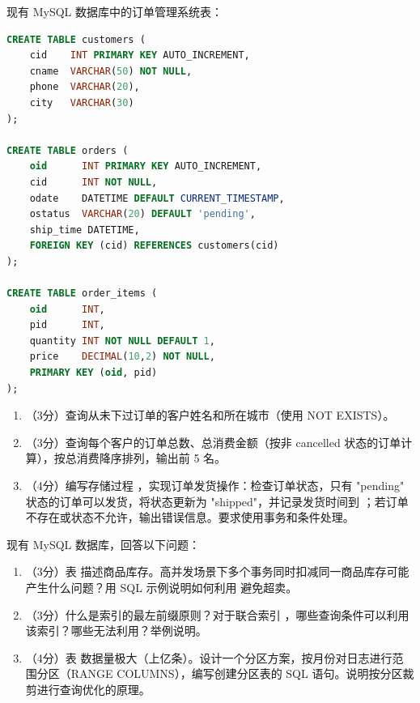 \documentclass[a4paper,11pt]{article}
\begin{document}
\q 现有 MySQL 数据库中的订单管理系统表：
\begin{lstlisting}[language=SQL]
CREATE TABLE customers (
    cid    INT PRIMARY KEY AUTO_INCREMENT,
    cname  VARCHAR(50) NOT NULL,
    phone  VARCHAR(20),
    city   VARCHAR(30)
);

CREATE TABLE orders (
    oid      INT PRIMARY KEY AUTO_INCREMENT,
    cid      INT NOT NULL,
    odate    DATETIME DEFAULT CURRENT_TIMESTAMP,
    ostatus  VARCHAR(20) DEFAULT 'pending',
    ship_time DATETIME,
    FOREIGN KEY (cid) REFERENCES customers(cid)
);

CREATE TABLE order_items (
    oid      INT,
    pid      INT,
    quantity INT NOT NULL DEFAULT 1,
    price    DECIMAL(10,2) NOT NULL,
    PRIMARY KEY (oid, pid)
);
\end{lstlisting}
\begin{enumerate}[leftmargin=2em, itemsep=3pt]
  \item[（1）] （3分）查询从未下过订单的客户姓名和所在城市（使用 NOT EXISTS）。
  \item[（2）] （3分）查询每个客户的订单总数、总消费金额（按非 cancelled 状态的订单计算），按总消费降序排列，输出前 5 名。
  \item[（3）] （4分）编写存储过程 ，实现订单发货操作：检查订单状态，只有 "pending" 状态的订单可以发货，将状态更新为 "shipped"，并记录发货时间到 ；若订单不存在或状态不允许，输出错误信息。要求使用事务和条件处理。
\end{enumerate}
\anslines{3cm}

\q 现有 MySQL 数据库，回答以下问题：
\begin{enumerate}[leftmargin=2em, itemsep=3pt]
  \item[（1）] （3分）表  描述商品库存。高并发场景下多个事务同时扣减同一商品库存可能产生什么问题？用 SQL 示例说明如何利用  避免超卖。
  \item[（2）] （3分）什么是索引的最左前缀原则？对于联合索引 ，哪些查询条件可以利用该索引？哪些无法利用？举例说明。
  \item[（3）] （4分）表  数据量极大（上亿条）。设计一个分区方案，按月份对日志进行范围分区（RANGE COLUMNS），编写创建分区表的 SQL 语句。说明按分区裁剪进行查询优化的原理。
\end{enumerate}
\anslines{3.5cm}
\end{document}
